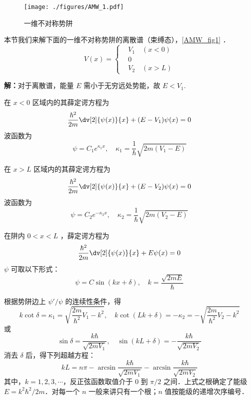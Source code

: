 
\begin{issues}
\issueTODO
\end{issues}

\begin{figure}[ht]
\centering
\texttt{[image: ./figures/AMW\_1.pdf]}
\caption{一维不对称势阱} \label{AMW_fig1}
\end{figure}
本节我们来解下面的一维不对称势阱的离散谱（束缚态），\autoref{AMW_fig1} ．
\begin{equation}
V(x)=\left\{\begin{aligned}
&V_1\quad(x<0)\\
&0\\
&V_2\quad(x>L)
\end{aligned}\right.
\end{equation}

\textbf{解：}对于离散谱，能量 $E$ 需小于无穷远处势能，故 $E<V_1$. 

在 $x<0$ 区域内的其薛定谔方程为
\begin{equation}
\frac{\hbar^2}{2m}\dv[2]{\psi(x)}{x}+(E-V_1)\psi(x)=0
\end{equation}
波函数为
\begin{equation}
\psi=C_1 e^{\kappa_1 x},\quad \kappa_1=\frac{1}{\hbar}\sqrt{2m(V_1-E)}
\end{equation}

在 $x>L$ 区域内的其薛定谔方程为
\begin{equation}
\frac{\hbar^2}{2m}\dv[2]{\psi(x)}{x}+(E-V_2)\psi(x)=0
\end{equation}
波函数为
\begin{equation}
\psi=C_2 e^{-\kappa_2 x},\quad \kappa_2=\frac{1}{\hbar}\sqrt{2m(V_2-E)}
\end{equation}

在阱内 $0 < x < L$ ，薛定谔方程为
\begin{equation}
\frac{\hbar^2}{2m}\dv[2]{\psi(x)}{x}+E\psi(x)=0
\end{equation}
$\psi$ 可取以下形式：
\begin{equation}
\psi=C\sin(kx+\delta),\quad k=\frac{\sqrt{2mE}}{\hbar}
\end{equation}

根据势阱边上 $\psi'/\psi$ 的连续性条件，得
\begin{equation}
k\cot\delta=\kappa_1=\sqrt{\frac{2m}{\hbar^2}V_1-k^2},\quad k\cot(Lk+\delta)=-\kappa_2=-\sqrt{\frac{2m}{\hbar^2}V_2-k^2}
\end{equation}
或
\begin{equation}
\sin\delta=\frac{k\hbar}{\sqrt{2mV_1}},\quad\sin(kL+\delta)=-\frac{k\hbar}{\sqrt{2mV_2}}
\end{equation}
消去 $\delta$ 后，得下列超越方程：
\begin{equation}\label{AMW_eq1}
kL=n\pi-\arcsin\frac{k\hbar}{\sqrt{2mV_1}}-\arcsin\frac{k\hbar}{\sqrt{2mV_2}}
\end{equation}
其中，$k=1,2,3,\cdots$，反正弦函数取值介于 $0$ 到 $\pi/2$ 之间．上式之根确定了能级 $E=k^2\hbar^2/2m$．对每一个 $n$ 一般来讲只有一个根；$n$ 值按能级的递增次序编号．

